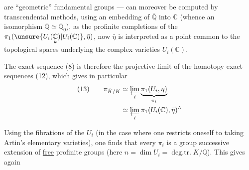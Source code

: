 are ``geometric'' fundamental groups ---  can moreover be computed by transcendental methods, using an embedding of $\overline{\mathbb Q}$ into $\mathbb C$ (whence an isomorphism $\overline{\mathbb Q}\simeq\overline{\mathbb Q}_0$), as the profinite completions of the $\pi_1(\unsure{U_i(\underset{k}{\mathbb C})|U_i(\mathbb C)},\bar\eta)$,  now $\bar\eta$ is interpreted as a  point common to the topological spaces underlying the complex varieties $U_i(\mathbb C)$.

The exact sequence (8) is therefore the projective limit of the homotopy exact sequences (12), which gives in particular
\[
\begin{aligned}
(13)\qquad \pi_{\bar K/K}&\simeq\varprojlim_i\underbrace{\pi_1(\bar U_i,\bar\eta)}_{\pi_i}\\
&\simeq\varprojlim_i\pi_1(U_i(\mathbb C),\bar\eta)^{\wedge}
\end{aligned}
\]

Using the fibrations of the $U_i$ (in the case where one restricts oneself to taking Artin's elementary varieties), one finds that every $\pi_i$ is a group  successive extension of  \uline{free} profinite groups (here $n=\dim U_i=\operatorname{deg.tr.}K/\mathbb Q$). This gives again
